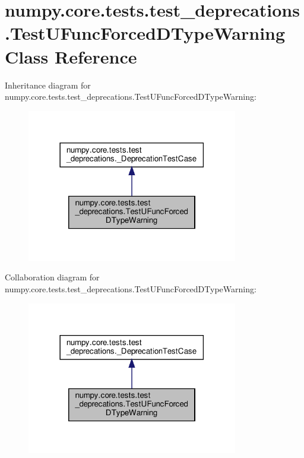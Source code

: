 \hypertarget{classnumpy_1_1core_1_1tests_1_1test__deprecations_1_1TestUFuncForcedDTypeWarning}{}\section{numpy.\+core.\+tests.\+test\+\_\+deprecations.\+Test\+U\+Func\+Forced\+D\+Type\+Warning Class Reference}
\label{classnumpy_1_1core_1_1tests_1_1test__deprecations_1_1TestUFuncForcedDTypeWarning}


Inheritance diagram for numpy.\+core.\+tests.\+test\+\_\+deprecations.\+Test\+U\+Func\+Forced\+D\+Type\+Warning\+:
\nopagebreak
\begin{figure}[H]
\begin{center}
\leavevmode
\includegraphics[width=261pt]{classnumpy_1_1core_1_1tests_1_1test__deprecations_1_1TestUFuncForcedDTypeWarning__inherit__graph}
\end{center}
\end{figure}


Collaboration diagram for numpy.\+core.\+tests.\+test\+\_\+deprecations.\+Test\+U\+Func\+Forced\+D\+Type\+Warning\+:
\nopagebreak
\begin{figure}[H]
\begin{center}
\leavevmode
\includegraphics[width=261pt]{classnumpy_1_1core_1_1tests_1_1test__deprecations_1_1TestUFuncForcedDTypeWarning__coll__graph}
\end{center}
\end{figure}
